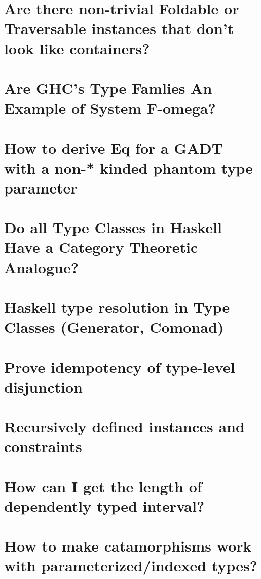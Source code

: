 \documentclass{book}
\begin{document}
\section{Are there non-trivial Foldable or Traversable instances that don't look like containers?}


\section{Are GHC's Type Famlies An Example of System F-omega?}


\section{How to derive Eq for a GADT with a non-* kinded phantom type parameter}


\section{Do all Type Classes in Haskell Have a Category Theoretic Analogue?}


\section{Haskell type resolution in Type Classes (Generator, Comonad)}


\section{Prove idempotency of type-level disjunction}


\section{Recursively defined instances and constraints}


\section{How can I get the length of dependently typed interval?}


\section{How to make catamorphisms work with parameterized/indexed types?}

\end{document}
